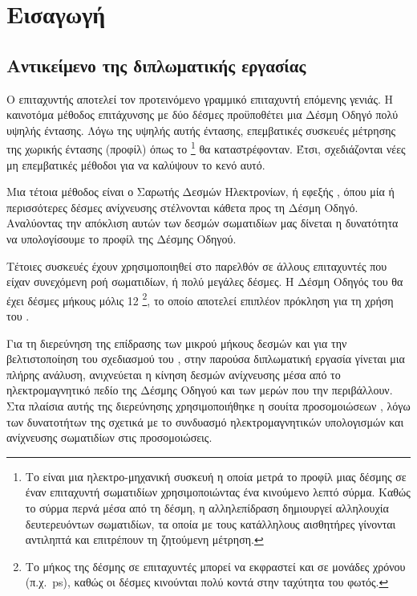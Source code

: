 \chapter{Εισαγωγή}


\epigraph{\textit{}}{}

\section{Αντικείμενο της διπλωματικής εργασίας}
Ο επιταχυντής  αποτελεί τον προτεινόμενο γραμμικό επιταχυντή επόμενης γενιάς.
Η καινοτόμα μέθοδος επιτάχυνσης με δύο δέσμες προϋποθέτει μια Δέσμη Οδηγό πολύ υψηλής έντασης.
Λόγω της υψηλής αυτής έντασης, επεμβατικές συσκευές μέτρησης της χωρικής έντασης (προφίλ) όπως το \footnote{Το  είναι μια ηλεκτρο-μηχανική συσκευή η οποία μετρά το προφίλ μιας δέσμης σε έναν επιταχυντή σωματιδίων χρησιμοποιώντας ένα κινούμενο λεπτό σύρμα.
Καθώς το σύρμα περνά μέσα από τη δέσμη, η αλληλεπίδραση δημιουργεί αλληλουχία δευτερευόντων σωματιδίων, τα οποία με τους κατάλληλους αισθητήρες γίνονται αντιληπτά και επιτρέπουν τη ζητούμενη μέτρηση.} θα καταστρέφονταν.
Έτσι, σχεδιάζονται νέες μη επεμβατικές μέθοδοι για να καλύψουν το κενό αυτό.

Μια τέτοια μέθοδος είναι ο Σαρωτής Δεσμών Ηλεκτρονίων, ή εφεξής , όπου μία ή περισσότερες δέσμες ανίχνευσης στέλνονται κάθετα προς τη Δέσμη Οδηγό.
Αναλύοντας την απόκλιση αυτών των δεσμών σωματιδίων μας δίνεται η δυνατότητα να υπολογίσουμε το προφίλ της Δέσμης Οδηγού.

Τέτοιες συσκευές έχουν χρησιμοποιηθεί στο παρελθόν σε άλλους επιταχυντές που είχαν συνεχόμενη ροή σωματιδίων, ή πολύ μεγάλες δέσμες.
Η Δέσμη Οδηγός του  θα έχει δέσμες μήκους μόλις 12 \footnote{Το μήκος της δέσμης σε επιταχυντές μπορεί να εκφραστεί και σε μονάδες χρόνου (π.χ.\ \si{\pico \second}), καθώς οι δέσμες κινούνται πολύ κοντά στην ταχύτητα του φωτός.}, το οποίο αποτελεί επιπλέον πρόκληση για τη χρήση του .

Για τη διερεύνηση της επίδρασης των μικρού μήκους δεσμών και για την βελτιστοποίηση του σχεδιασμού του , στην παρούσα διπλωματική εργασία γίνεται μια πλήρης ανάλυση,  ανιχνεύεται η κίνηση δεσμών ανίχνευσης μέσα από το ηλεκτρομαγνητικό πεδίο της Δέσμης Οδηγού και των μερών που την περιβάλλουν. 
Στα πλαίσια αυτής της διερεύνησης χρησιμοποιήθηκε η σουίτα προσομοιώσεων , λόγω των δυνατοτήτων της σχετικά με το συνδυασμό ηλεκτρομαγνητικών υπολογισμών και ανίχνευσης σωματιδίων στις προσομοιώσεις.

